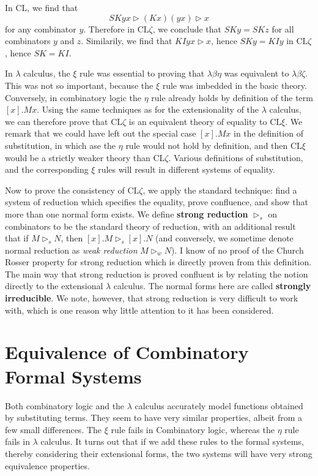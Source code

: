 \begin{example}
    In $\text{CL}$, we find that
    \[ SKyx \rhd (Kx)(yx) \rhd x \]
    for any combinator $y$. Therefore in $\text{CL} \zeta$, we conclude that $SKy = SKz$ for all combinators $y$ and $z$. Similarily, we find that $KIyx \rhd x$, hence $SKy = KIy$ in $\text{CL} \zeta$, hence $SK = KI$.
\end{example}

In $\lambda$ calculus, the $\xi$ rule was essential to proving that $\lambda \beta \eta$ was equivalent to $\lambda \beta \zeta$. This was not so important, because the $\xi$ rule was imbedded in the basic theory. Conversely, in combinatory logic the $\eta$ rule already holds by definition of the term $[x].Mx$. Using the same techniques as for the extensionality of the $\lambda$ calculus, we can therefore prove that $\text{CL} \zeta$ is an equivalent theory of equality to $\text{CL} \xi$. We remark that we could have left out the special case $[x].Mx$ in the definition of substitution, in which ase the $\eta$ rule would not hold by definition, and then $\text{CL} \xi$ would be a strictly weaker theory than $\text{CL} \zeta$. Various definitions of substitution, and the corresponding $\xi$ rules will result in different systems of equality.

Now to prove the consistency of $\text{CL} \zeta$, we apply the standard technique: find a system of reduction which specifies the equality, prove confluence, and show that more than one normal form exists. We define {\bf strong reduction} $\rhd_s$ on combinators to be the standard theory of reduction, with an additional result that if $M \rhd_s N$, then $[x].M \rhd_s [x].N$ (and conversely, we sometime denote normal reduction as {\it weak reduction} $M \rhd_w N$). I know of no proof of the Church Rosser property for strong reduction which is directly proven from this definition. The main way that strong reduction is proved confluent is by relating the notion directly to the extensional $\lambda$ calculus. The normal forms here are called {\bf strongly irreducible}. We note, however, that strong reduction is very difficult to work with, which is one reason why little attention to it has been considered.

\section{Equivalence of Combinatory Formal Systems}

Both combinatory logic and the $\lambda$ calculus accurately model functions obtained by substituting terms. They seem to have very similar properties, albeit from a few small differences. The $\xi$ rule fails in Combinatory logic, whereas the $\eta$ rule fails in $\lambda$ calculus. It turns out that if we add these rules to the formal systems, thereby considering their extensional forms, the two systems will have very strong equivalence properties.

